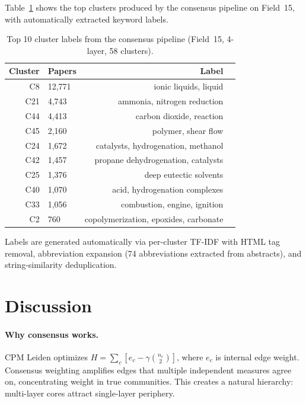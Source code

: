 \documentclass[11pt,a4paper]{article}
\begin{document}
Table~\ref{tab:labels} shows the top clusters produced by the consensus pipeline on Field~15, with automatically extracted keyword labels.

\begin{table}[h]
\centering
\caption{Top 10 cluster labels from the consensus pipeline (Field~15, 4-layer, 58 clusters).}
\label{tab:labels}
\begin{tabular}{rlrl}
\toprule
Cluster & Papers & Label \\
\midrule
C8 & 12{,}771 & ionic liquids, liquid \\
C21 & 4{,}743 & ammonia, nitrogen reduction \\
C44 & 4{,}413 & carbon dioxide, reaction \\
C45 & 2{,}160 & polymer, shear flow \\
C24 & 1{,}672 & catalysts, hydrogenation, methanol \\
C42 & 1{,}457 & propane dehydrogenation, catalysts \\
C25 & 1{,}376 & deep eutectic solvents \\
C40 & 1{,}070 & acid, hydrogenation complexes \\
C33 & 1{,}056 & combustion, engine, ignition \\
C2 & 760 & copolymerization, epoxides, carbonate \\
\bottomrule
\end{tabular}
\end{table}

Labels are generated automatically via per-cluster TF-IDF with HTML tag removal, abbreviation expansion (74 abbreviations extracted from abstracts), and string-similarity deduplication.

\section{Discussion}

\paragraph{Why consensus works.} CPM Leiden optimizes $H = \sum_c \left[e_c - \gamma \binom{n_c}{2}\right]$, where $e_c$ is internal edge weight. Consensus weighting amplifies edges that multiple independent measures agree on, concentrating weight in true communities. This creates a natural hierarchy: multi-layer cores attract single-layer periphery.
\end{document}
